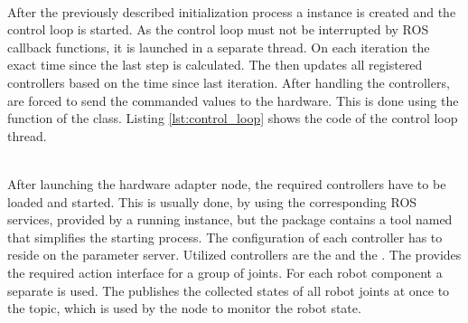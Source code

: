 \begin{minipage}{\linewidth}

\end{minipage} \\

After the previously described initialization process a  instance is created and the control loop is started. As the control loop must not be interrupted by ROS callback functions, it is launched in a separate thread. On each iteration the exact time since the last step is calculated. The  then updates all registered controllers based on the time since last iteration. After handling the controllers,  are forced to send the commanded values to the hardware. This is done using the  function of the  class. Listing \ref{lst:control_loop} shows the code of the control loop thread. \\

\begin{minipage}{\linewidth}

\end{minipage} \\

After launching the hardware adapter node, the required controllers have to be loaded and started. This is usually done, by using the corresponding ROS services, provided by a running  instance, but the  package contains a tool named  that simplifies the starting process. The configuration of each controller has to reside on the parameter server. Utilized controllers are the  and the . The  provides the required  action interface for a group of joints. For each robot component a separate  is used. The  publishes the collected states of all robot joints at once to the  topic, which is used by the  node to monitor the robot state.

\begin{minipage}{\linewidth}

\end{minipage} \\

